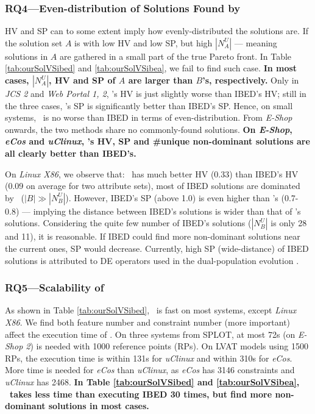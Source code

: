 \subsubsection{RQ4---Even-distribution of Solutions Found by \ourSol}\label{sec:results:rq4}
HV and SP can to some extent imply how evenly-distributed the solutions are. If the solution set $A$ is with low HV and low SP, but high $|N^U_A|$ --- meaning solutions in $A$ are gathered in a small part of  the true Pareto front. In Table \ref{tab:ourSolVSibed} and \ref{tab:ourSolVSibea}, we fail to find such case. \textbf{In most cases, $|N^U_A|$, HV and SP of $A$ are larger than $B$'s, respectively.} Only in \emph{JCS 2} and \emph{Web Portal 1, 2},  \ourSol's HV is just slightly worse than IBED's HV; still in the three cases, \ourSol's SP is significantly better than IBED's SP. Hence, on small systems, \ourSol~is no worse than IBED in terms of even-distribution. From  \emph{E-Shop} onwards, the two methods share no commonly-found solutions. \textbf{On \emph{E-Shop}, \emph{eCos} and \emph{uClinux},  \ourSol's HV, SP and \#unique non-dominant solutions are all clearly better than IBED's.}

 On \emph{Linux X86}, we observe that: \ourSol~has much better HV (0.33) than IBED's HV (0.09 on average for two attribute sets), most of IBED solutions are dominated by  \ourSol~($|B| \gg |N^U_B|$). However, IBED's SP (above 1.0) is even higher than \ourSol's (0.7-0.8) --- implying the distance between IBED's solutions is wider than that of \ourSol's solutions. Considering the quite few number of IBED's solutions ($|N^U_B|$ is only 28 and 11), it is reasonable. If IBED could find more non-dominant solutions near the current ones, SP would decrease. Currently, high SP (wide-distance) of IBED solutions is attributed to DE operators used in the dual-population evolution \cite{DBLP:journals/asc/XueZT0CC016}.

\subsubsection{RQ5---Scalability of \ourSol}\label{sec:results:rq5}
As shown in Table \ref{tab:ourSolVSibed}, \ourSol~is fast on most systems, except \emph{Linux X86}. We find both feature number and constraint number (more important) affect the execution time of \ourSol. On three systems from SPLOT, at most 72s (on \emph{E-Shop 2}) is needed with 1000 reference points (RPs). On LVAT models using 1500  RPs, the execution time is within 131s for  \emph{uClinux} and within  310s for  \emph{eCos}. More time is needed for \emph{eCos} than \emph{uClinux}, as \emph{eCos} has 3146 constraints and  \emph{uClinux} has 2468. \textbf{In Table \ref{tab:ourSolVSibed} and \ref{tab:ourSolVSibea}, \ourSol~takes less time than executing IBED 30 times, but find more non-dominant solutions in most cases.}

